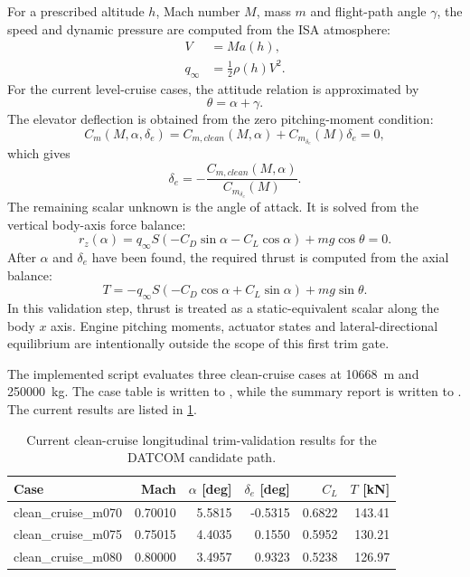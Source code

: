 For a prescribed altitude $h$, Mach number $M$, mass $m$ and flight-path angle $\gamma$, the speed and dynamic pressure are computed from the ISA atmosphere:
\begin{align}
    V &= Ma(h), \\
    q_{\infty} &= \frac{1}{2}\rho(h)V^2.
\end{align}
For the current level-cruise cases, the attitude relation is approximated by
\begin{equation}
    \theta = \alpha + \gamma.
\end{equation}
The elevator deflection is obtained from the zero pitching-moment condition:
\begin{equation}
    C_m(M,\alpha,\delta_e)
    =
    C_{m,clean}(M,\alpha)
    + C_{m_{\delta_e}}(M)\delta_e
    = 0,
\end{equation}
which gives
\begin{equation}
    \delta_e =
    -\frac{C_{m,clean}(M,\alpha)}{C_{m_{\delta_e}}(M)}.
\end{equation}
The remaining scalar unknown is the angle of attack. It is solved from the vertical body-axis force balance:
\begin{equation}
    r_z(\alpha) =
    q_{\infty}S\left(
        -C_D\sin\alpha - C_L\cos\alpha
    \right)
    + mg\cos\theta = 0.
\end{equation}
After $\alpha$ and $\delta_e$ have been found, the required thrust is computed from the axial balance:
\begin{equation}
    T =
    -q_{\infty}S\left(
        -C_D\cos\alpha + C_L\sin\alpha
    \right)
    + mg\sin\theta.
\end{equation}
In this validation step, thrust is treated as a static-equivalent scalar along the body $x$ axis. Engine pitching moments, actuator states and lateral-directional equilibrium are intentionally outside the scope of this first trim gate.

The implemented script  evaluates three clean-cruise cases at \SI{10668}{\metre} and \SI{250000}{\kilogram}. The case table is written to , while the summary report is written to . The current results are listed in \cref{tab:trim_validation_results}.

\begin{table}[H]
    \centering
    \caption{Current clean-cruise longitudinal trim-validation results for the DATCOM candidate path.}
    \label{tab:trim_validation_results}
    \begin{tabular}{lrrrrr}
        \toprule
        Case & Mach & $\alpha$ [deg] & $\delta_e$ [deg] & $C_L$ & $T$ [kN] \\
        \midrule
        clean\_cruise\_m070 & 0.70010 & 5.5815 & -0.5315 & 0.6822 & 143.41 \\
        clean\_cruise\_m075 & 0.75015 & 4.4035 & 0.1550 & 0.5952 & 130.21 \\
        clean\_cruise\_m080 & 0.80000 & 3.4957 & 0.9323 & 0.5238 & 126.97 \\
        \bottomrule
    \end{tabular}
\end{table}

